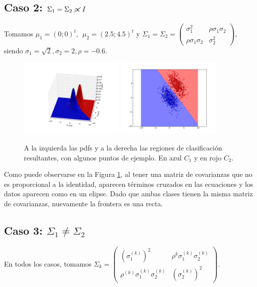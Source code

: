 \documentclass[a4paper,11pt]{article}
\begin{document}
\subsection*{Caso 2: $\Sigma_1 = \Sigma_2 \  \cancel{\propto} \  I$}
Tomamos $\mu_1 = (0;0)^t, \ \ \mu_2 = (2.5; 4.5)^t$ y $\Sigma_1=\Sigma_2 = \begin{pmatrix}\sigma_1^2 & \rho\sigma_1\sigma_2 \\ \rho\sigma_1\sigma_2 & \sigma_2^2 \end{pmatrix}$, siendo $\sigma_1 = \sqrt{2}, \sigma_2 = 2, \rho=-0.6 $.

\begin{figure}[h!]
\centering
\includegraphics[width=0.45\textwidth]{img/ej1-caso2-pdf.png}
\includegraphics[width=0.45\textwidth]{img/ej1-caso2-region.png}
\caption{A la izquierda las pdfs y a la derecha las regiones de clasificación resultantes, con algunos puntos de ejemplo. En azul $C_1$ y en rojo $C_2$.}
\label{ej1_caso2}
\end{figure}

Como puede observarse en la Figura \ref{ej1_caso2}, al tener una matriz de covarianzas que no es proporcional a la identidad, aparecen términos cruzados en las ecuaciones y los datos aparecen como en un elipse. Dado que ambas clases tienen la misma matriz de covarianzas, nuevamente la frontera es una recta.


\subsection*{Caso 3: $\Sigma_1 \neq \Sigma_2$}
En todos los casos, tomamos $\Sigma_k=\begin{pmatrix}(\sigma_1^{(k)})^2 & \rho^k\sigma_1^{(k)}\sigma_2^{(k)} \\ \rho^{(k)}\sigma_1^{(k)}\sigma_2^{(k)} & (\sigma_2^{(k)})^2 \end{pmatrix}$.
\end{document}
